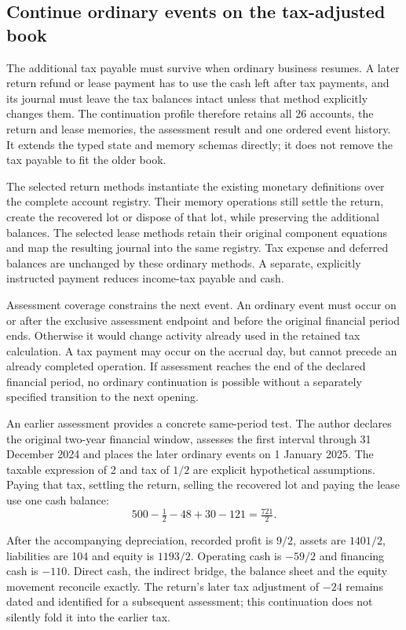
\subsection{Continue ordinary events on the tax-adjusted book}

The additional tax payable must survive when ordinary business resumes. A
later return refund or lease payment has to use the cash left after tax
payments, and its journal must leave the tax balances intact unless that
method explicitly changes them. The continuation profile therefore retains
all 26 accounts, the return and lease memories, the assessment result and one
ordered event history. It extends the typed state and memory schemas directly;
it does not remove the tax payable to fit the older book.

The selected return methods instantiate the existing monetary definitions over
the complete account registry. Their memory operations still settle the return,
create the recovered lot or dispose of that lot, while preserving the additional
balances. The selected lease methods retain their original component equations
and map the resulting journal into the same registry. Tax expense and deferred
balances are unchanged by these ordinary methods. A separate, explicitly
instructed payment reduces income-tax payable and cash.

Assessment coverage constrains the next event. An ordinary event must occur on
or after the exclusive assessment endpoint and before the original financial
period ends. Otherwise it would change activity already used in the retained
tax calculation. A tax payment may occur on the accrual day, but cannot precede
an already completed operation. If assessment reaches the end of the declared
financial period, no ordinary continuation is possible without a separately
specified transition to the next opening.

\begin{samepage}
An earlier assessment provides a concrete same-period test. The author declares
the original two-year financial window, assesses the first interval through
31 December 2024 and places the later ordinary events on 1 January 2025.
The taxable expression of 2 and tax of $1/2$ are explicit hypothetical
assumptions. Paying that tax, settling the return, selling the recovered lot
and paying the lease use one cash balance:
\[
 500-\tfrac12-48+30-121=\tfrac{721}{2}.
\]
\end{samepage}
After the accompanying depreciation, recorded profit is $9/2$, assets are
$1401/2$, liabilities are 104 and equity is $1193/2$. Operating cash is
$-59/2$ and financing cash is $-110$. Direct cash, the indirect bridge,
the balance sheet and the equity movement reconcile exactly. The return's
later tax adjustment of $-24$ remains dated and identified for a subsequent
assessment; this continuation does not silently fold it into the earlier tax.

